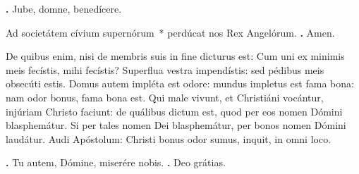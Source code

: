 \begin{small}
\textbf{\Vbar.} Jube, domne, benedícere.

Ad societátem cívium supernórum~* perdúcat nos Rex Angelórum. \textbf{\Rbar.} Amen.
\end{small}


De quibus enim, nisi de membris suis in fine dicturus est: Cum uni ex minimis meis fecístis, mihi fecístis? Superflua vestra impendístis: sed pédibus meis obsecúti estis. Domus autem impléta est odore: mundus impletus est fama bona: nam odor bonus, fama bona est. Qui male vivunt, et Christiáni vocántur, injúriam Christo faciunt: de quálibus dictum est, quod per eos nomen Dómini blasphemátur. Si per tales nomen Dei blasphemátur, per bonos nomen Dómini laudátur. Audi Apóstolum: Christi bonus odor sumus, inquit, in omni loco.

\textbf{\Vbar.} Tu autem, Dómine, miserére nobis.
\textbf{\Rbar.} Deo grátias.

